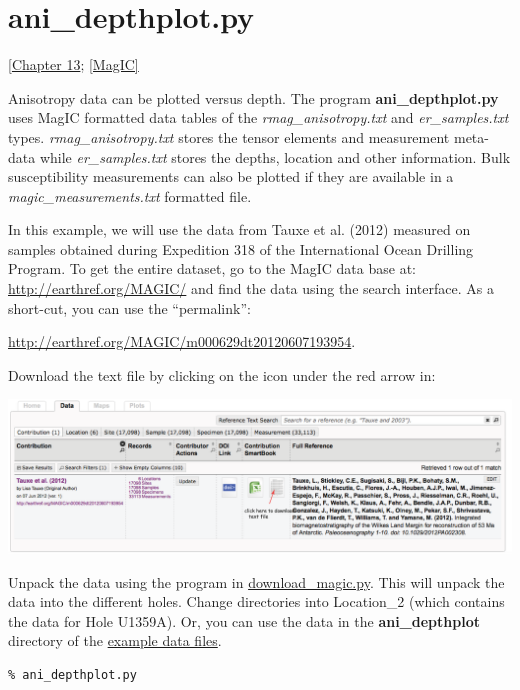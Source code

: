 \documentclass[11pt]{book}
\begin{document}
{{{{%
\section {\bf ani\_depthplot.py} 
[\href{http://magician.ucsd.edu/Essentials/WebBook2.html#Paleomagnetic_tensors}{Chapter 13}; 
\href{#MagIC}{[MagIC]}
\label{ex:ani_depth} 

Anisotropy data can be plotted versus depth.  The program {\bf ani\_depthplot.py} uses MagIC formatted data tables of the {\it rmag\_anisotropy.txt} and {\it er\_samples.txt} types.  {\it rmag\_anisotropy.txt} stores the tensor elements and measurement meta-data while {\it er\_samples.txt} stores the depths, location and other information.  Bulk susceptibility measurements can also be plotted if they are available in a {\it magic\_measurements.txt} formatted file.  

In this example, we will use the data from Tauxe et al. (2012) \nocite{tauxe12} measured on samples obtained during Expedition 318 of the International Ocean Drilling Program.  To get the entire dataset, go to the MagIC data base at:  \url{http://earthref.org/MAGIC/}   
and find the data using the search interface.   As a short-cut, you can use the ``permalink'': 

\url{http://earthref.org/MAGIC/m000629dt20120607193954}.   

Download the text file by clicking on the icon under the red arrow in:

  \includegraphics[width=15 cm]{EPSfiles/tauxe12-magic.eps}

Unpack the data using the program in \href{#dowload_magic.py}{download\_magic.py}.  This will unpack the data into the different holes.  Change directories into Location\_2 (which contains the data for Hole U1359A).  Or, you can use the data in the {\bf ani\_depthplot} directory of the \href{#Examples}{example data files}.


\begin{verbatim}
% ani_depthplot.py
\end{verbatim}

}}}}
\end{document}
